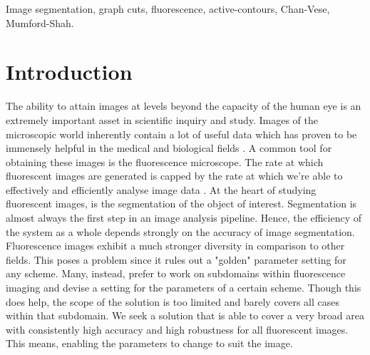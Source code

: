 \documentclass[10pt, journal, letterpaper, onecolumn, draftcls]{IEEEtran}
\begin{document}
\begin{IEEEkeywords}
Image segmentation, graph cuts, fluorescence, active-contours, Chan-Vese, Mumford-Shah.
\end{IEEEkeywords}






%



\section{Introduction}
\label{sec:Intro}
The ability to attain images at levels beyond the capacity of the human eye is an extremely important asset in scientific inquiry and study. Images of the microscopic world inherently contain a lot of useful data which has proven to be immensely helpful in the medical and biological fields \cite{Spring2003,Danek2012,Hubeny2008,Fatima2008,Matula2012}. A common tool for obtaining these images is the fluorescence microscope. The rate at which fluorescent images are generated is capped by the rate at which we're able to effectively and efficiently analyse image data \cite{Matula2012}. At the heart of studying fluorescent images, is the segmentation of the object of interest.
Segmentation is almost always the first step in an image analysis pipeline. Hence, the efficiency of the system as a whole depends strongly on the accuracy of image segmentation.
Fluorescence images exhibit a much stronger diversity in comparison to other fields. This poses a problem since it rules out a "golden" parameter setting for any scheme. Many, instead, prefer to work on subdomains within fluorescence imaging and devise a setting for the parameters of a certain scheme. Though this does help, the scope of the solution is too limited and barely covers all cases within that subdomain. We seek a solution that is able to cover a very broad area with consistently high accuracy and high robustness for all fluorescent images. This means, enabling the parameters to change to suit the image.
\end{document}
